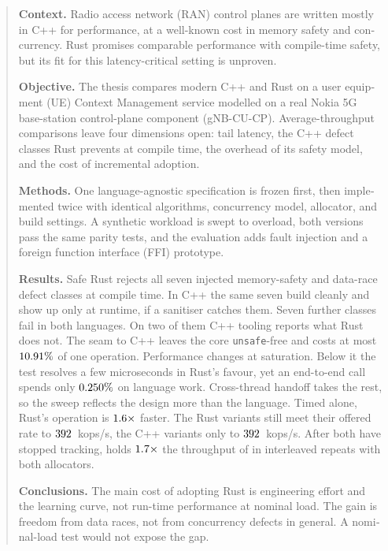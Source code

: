 \documentclass[english,oneside,a4paper,censored,csm,software-track-2020]{HYthesisML}
\begin{document}
{\singlespacing
\begin{otherlanguage}{english}
\begin{abstract}
\noindent\textbf{Context.}
Radio access network (RAN) control planes are written mostly in C++ for performance, at a
well-known cost in memory safety and concurrency. Rust promises comparable performance with
compile-time safety, but its fit for this latency-critical setting is unproven.

\noindent\textbf{Objective.}
The thesis compares modern C++ and Rust on a user equipment (UE) Context Management service
modelled on a real Nokia 5G base-station control-plane component (gNB-CU-CP).
Average-throughput comparisons leave four dimensions open: tail latency, the C++ defect classes Rust prevents at compile time, the overhead of
its safety model, and the cost of incremental adoption.

\noindent\textbf{Methods.}
One language-agnostic specification is frozen first, then implemented twice with identical
algorithms, concurrency model, allocator, and build settings. A synthetic workload is swept to
overload, both versions pass the same parity tests, and the evaluation adds fault injection and a
foreign function interface (FFI) prototype.

\noindent\textbf{Results.}
Safe Rust rejects all seven injected memory-safety and data-race defect classes at compile
time. In C++ the same seven build cleanly and show up only at runtime, if a sanitiser catches
them. Seven further classes fail in both languages. On two of them C++ tooling reports what
Rust does not. The seam to C++ leaves the core \texttt{unsafe}-free and costs at most
$\FfiOpBoundPct\%$ of one operation. Performance changes at saturation. Below it the test resolves a few microseconds in Rust's favour, yet an end-to-end call spends only $\BudgetCoreShareMax\%$ on language
work. Cross-thread handoff takes the rest, so the sweep reflects the design more than the
language. Timed alone, Rust's operation is $\BudgetCoreRatio\times$ faster. The Rust variants still meet their offered rate to $\TrackingLoadRust$~kops/s, the C++ variants only to $\TrackingLoadCpp$~kops/s. After both have stopped tracking, \OverloadSustainedFaster{} holds
$\OverloadThrRatio\times$ the throughput of \OverloadSustainedSlower{} in \OverloadThrAgree{}
interleaved repeats with both allocators. 

\noindent\textbf{Conclusions.}
The main cost of adopting Rust is engineering effort and the learning curve, not run-time
performance at nominal load. The gain is freedom from data races, not from concurrency
defects in general. A nominal-load test would not expose the gap.
\end{abstract}
\end{otherlanguage}
}
\end{document}

